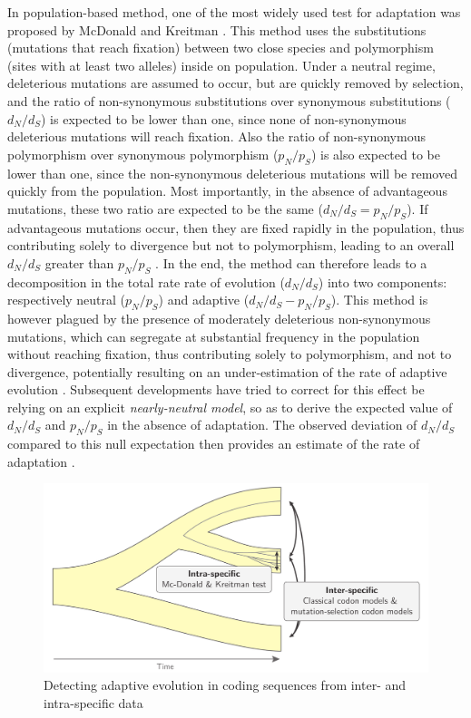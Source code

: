 In population-based method, one of the most widely used test for adaptation was proposed by McDonald and Kreitman \cite{McDonald1991}. This method uses the substitutions (mutations that reach fixation) between two close species and polymorphism (sites with at least two alleles) inside on population. Under a neutral regime, deleterious mutations are assumed to occur, but are quickly removed by selection, and the ratio of non-synonymous substitutions over synonymous substitutions ($d_N/d_S$) is expected to be lower than one, since none of non-synonymous deleterious mutations will reach fixation. Also the ratio of non-synonymous polymorphism over synonymous polymorphism ($p_N/p_S$) is also expected to be lower than one, since the non-synonymous deleterious mutations will be removed quickly from the population. Most importantly, in the absence of advantageous mutations, these two ratio are expected to be the same ($d_N/d_S=p_N/p_S$). If advantageous mutations occur, then they are fixed rapidly in the population, thus contributing solely to divergence but not to polymorphism, leading to an overall $d_N/d_S$ greater than $p_N/p_S$ \cite{smith_adaptive_2002, kimura_neutral_1983}. In the end, the method can therefore leads to a decomposition in the total rate rate of evolution ($d_N/d_S$) into two components: respectively neutral ($p_N/p_S$) and adaptive ($d_N/d_S-p_N/p_S$). This method is however plagued by the presence of moderately deleterious non-synonymous mutations, which can segregate at substantial frequency in the population without reaching fixation, thus contributing solely to polymorphism, and not to divergence, potentially resulting on an under-estimation of the rate of adaptive evolution \cite{eyre-walker_quantifying_2002}. Subsequent developments have tried to correct for this effect be relying on an explicit \textit{nearly-neutral model}, so as to derive the expected value of $d_N/d_S$ and $p_N/p_S$ in the absence of adaptation. The observed deviation of $d_N/d_S$ compared to this null expectation then provides an estimate of the rate of adaptation \cite{eyre-walker_estimating_2009, galtier_adaptive_2016}.

\begin{figure}[thbp]
	\begin{center}
		\includegraphics[width=\textwidth] {figures/inter-intra}
	\end{center}
	\caption{Detecting adaptive evolution in coding sequences from inter- and intra-specific data}
\end{figure}

